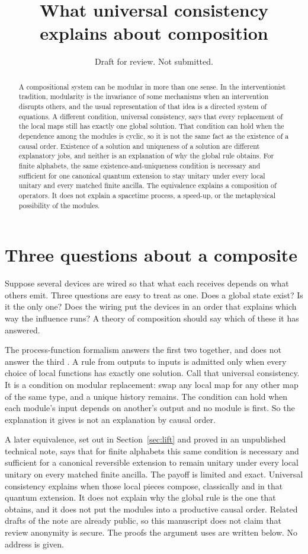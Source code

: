 \documentclass[11pt]{article}
\title{What universal consistency explains about composition}
\author{}
\date{Draft for review. Not submitted.}
\begin{document}
\maketitle
\begin{abstract}
A compositional system can be modular in more than one sense. In the interventionist tradition, modularity is the invariance of some mechanisms when an intervention disrupts others, and the usual representation of that idea is a directed system of equations. A different condition, universal consistency, says that every replacement of the local maps still has exactly one global solution. That condition can hold when the dependence among the modules is cyclic, so it is not the same fact as the existence of a causal order. Existence of a solution and uniqueness of a solution are different explanatory jobs, and neither is an explanation of why the global rule obtains. For finite alphabets, the same existence-and-uniqueness condition is necessary and sufficient for one canonical quantum extension to stay unitary under every local unitary and every matched finite ancilla. The equivalence explains a composition of operators. It does not explain a spacetime process, a speed-up, or the metaphysical possibility of the modules.
\end{abstract}

\section{Three questions about a composite}
\label{sec:three}

Suppose several devices are wired so that what each receives depends on what others emit. Three questions are easy to treat as one. Does a global state exist? Is it the only one? Does the wiring put the devices in an order that explains which way the influence runs? A theory of composition should say which of these it has answered.

The process-function formalism answers the first two together, and does not answer the third \citep{baumeler2016}. A rule from outputs to inputs is admitted only when every choice of local functions has exactly one solution. Call that universal consistency. It is a condition on modular replacement: swap any local map for any other map of the same type, and a unique history remains. The condition can hold when each module's input depends on another's output and no module is first. So the explanation it gives is not an explanation by causal order.

A later equivalence, set out in Section~\ref{sec:lift} and proved in an unpublished technical note, says that for finite alphabets this same condition is necessary and sufficient for a canonical reversible extension to remain unitary under every local unitary on every matched finite ancilla. The payoff is limited and exact. Universal consistency explains when those local pieces compose, classically and in that quantum extension. It does not explain why the global rule is the one that obtains, and it does not put the modules into a productive causal order. Related drafts of the note are already public, so this manuscript does not claim that review anonymity is secure. The proofs the argument uses are written below. No address is given.
\end{document}

